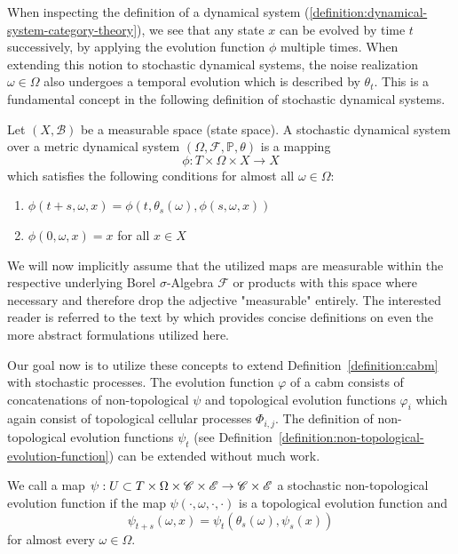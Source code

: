 When inspecting the definition of a dynamical system
(\ref{definition:dynamical-system-category-theory}), we see that any state $x$ can be evolved by
time $t$ successively, by applying the evolution function $\phi$ multiple times.
When extending this notion to stochastic dynamical systems, the noise realization $\omega\in\Omega$
also undergoes a temporal evolution which is described by $\theta_t$.
This is a fundamental concept in the following definition of stochastic dynamical systems.

\begin{definition}
    Let $(X,\mathcal{B})$ be a measurable space (state space).
    A stochastic dynamical system over a metric dynamical system
    $(\Omega,\mathcal{F},\mathbb{P},\theta)$ is a mapping
    \begin{equation}
        \phi:T\times\Omega\times X\rightarrow X
    \end{equation}
    which satisfies the following conditions for almost all $\omega\in\Omega$:
    \begin{enumerate}
        \item $\phi(t+s,\omega,x)=\phi(t,\theta_s(\omega),\phi(s,\omega,x))$
            \label{definition:stochastic-dynamical-system-condition-1}
        \item $\phi(0,\omega,x)=x$ for all $x\in X$
    \end{enumerate}
    \label{definition:stochastic-dynamical-system}
\end{definition}

We will now implicitly assume that the utilized maps are measurable within the respective underlying
Borel $\sigma$-Algebra $\mathcal{F}$ or products with this space where necessary and therefore
drop the adjective "measurable" entirely.
The interested reader is referred to the text by \citet{Arnold1998} which provides concise
definitions on even the more abstract formulations utilized here.

Our goal now is to utilize these concepts to extend Definition~\ref{definition:cabm} with stochastic
processes.
The evolution function $\varphi$ of a \ac{cabm} consists of concatenations of non-topological
$\psi$ and topological evolution functions $\varphi_i$ which again consist of topological cellular
processes $\Phi_{i,j}$.
The definition of non-topological evolution functions $\psi_t$
(see Definition~\ref{definition:non-topological-evolution-function}) can be extended without much
work.

\begin{definition}
    We call a map $\psi:U\subset T\times\Omega\times\mathscr{C}\times\mathscr{E}\rightarrow\mathscr{C}\times\mathscr{E}$ a
    stochastic non-topological evolution function if the map $\psi(\cdot,\omega,\cdot,\cdot)$ is a
    topological evolution function and
    \begin{equation}
        \psi_{t+s}(\omega,x)=\psi_t(\theta_s(\omega),\psi_s(x))
    \end{equation}
    for almost every $\omega\in\Omega$.
\end{definition}

